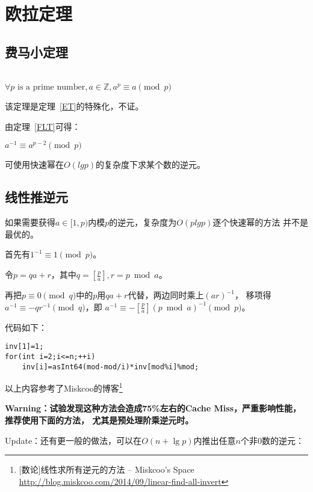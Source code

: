 \section{欧拉定理}
\subsection{费马小定理}\label{FLTS}
\begin{theorem}\label{FLT}
	~\\
	$\forall p \textrm{ is a prime number},a\in \mathbb{Z},a^p \equiv a \pmod{p}$
\end{theorem}

该定理是定理~\ref{ET}的特殊化，不证。

由定理~\ref{FLT}可得：

\begin{inference}
	$a^{-1} \equiv a^{p-2} \pmod{p}$
\end{inference}

可使用快速幂在$O(lgp)$的复杂度下求某个数的逆元。

\subsection{线性推逆元}

如果需要获得$a\in [1,p)$内模$p$的逆元，复杂度为$O(plgp)$逐个快速幂的方法
并不是最优的。

首先有$1^{-1}\equiv 1 \pmod{p}$。

令$p=qa+r$，其中$q=[\frac{p}{a}],r=p \bmod a$。

再把$p \equiv 0 \pmod{q}$中的$p$用$qa+r$代替，两边同时乘上$(ar)^{-1}$，
移项得$a^{-1}\equiv -qr^{-1} \pmod{q}$，即
$a^{-1}\equiv -[\frac{p}{a}](p \bmod a)^{-1} \pmod{p}$。

代码如下：
\begin{lstlisting}[title=inv]
inv[1]=1;
for(int i=2;i<=n;++i)
    inv[i]=asInt64(mod-mod/i)*inv[mod%i]%mod;
\end{lstlisting}

以上内容参考了Miskcoo的博客\footnote{[数论]线性求所有逆元的方法 – Miskcoo's Space\\
	\url{http://blog.miskcoo.com/2014/09/linear-find-all-invert}}

{\bfseries
Warning：试验发现这种方法会造成75\%左右的Cache Miss，严重影响性能，推荐使用下面的方法，
尤其是预处理阶乘逆元时。
}

Update：还有更一般的做法，可以在$O(n+\lg p)$内推出任意$n$个非0数的逆元：

